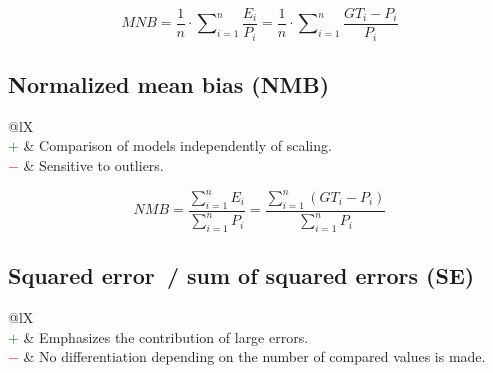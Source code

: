 \documentclass{article}
\begin{document}
\begin{equation}
    \textit{MNB} = \dfrac{1}{n} \cdot \sum\nolimits_{i = 1}^n \dfrac{E_i}{P_i} = \dfrac{1}{n} \cdot \sum\nolimits_{i = 1}^n \dfrac{\textit{GT}_i - P_i}{P_i}
%
    \label{equation:MNB}
\end{equation}


\subsection[Normalized mean bias (NMB)]{Normalized mean bias (NMB) \cite{mebust2003models, yu2006new}}

\begin{table}[H]\centering
    \begin{tabularx}{\textwidth}{@{}lX}
         \\
        \textcolor{Green}{$+$} & Comparison of models independently of scaling. \\
        \textcolor{Red}{$-$}   & Sensitive to outliers.
    \end{tabularx}
\end{table}

\begin{equation}
    \textit{NMB} = \dfrac{\sum\nolimits_{i = 1}^n E_i}{\sum\nolimits_{i = 1}^n P_i} = \dfrac{\sum\nolimits_{i = 1}^n (\textit{GT}_i - P_i)}{\sum\nolimits_{i = 1}^n P_i}
%
    \label{equation:NMB}
\end{equation}


\subsection[Squared error~/ sum of squared errors (SE)]{Squared error~/ sum of squared errors (SE) \cite{draper1998applied}}

\begin{table}[H]\centering
    \begin{tabularx}{\textwidth}{@{}lX}
        \multicolumn{2}{@{}X}{Calculates the sum (total) of all squared errors. (range: $[0, \infty)$)} \\
        \textcolor{Green}{$+$} & Emphasizes the contribution of large errors. \\
        \textcolor{Red}{$-$}   & No differentiation depending on the number of compared values is made.
    \end{tabularx}
\end{table}
\end{document}
